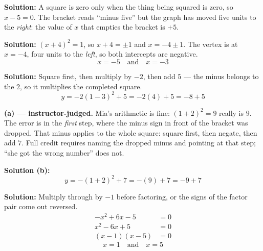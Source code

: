 \documentclass[12pt]{article}
\begin{document}




\textbf{Solution:} A square is zero only when the thing being squared is zero, so $x - 5 = 0$. The bracket reads ``minus five'' but the graph has moved five units to the \emph{right}: the value of $x$ that empties the bracket is $+5$. 


\textbf{Solution:} $(x+4)^2 = 1$, so $x + 4 = \pm 1$ and $x = -4 \pm 1$. The vertex is at $x = -4$, four units to the \emph{left}, so both intercepts are negative.
\[ \boxed{x = -5 \quad \text{and} \quad x = -3} \]


\textbf{Solution:} Square first, then multiply by $-2$, then add $5$ --- the minus belongs to the $2$, so it multiplies the completed square.
\[ y = -2(1-3)^2 + 5 = -2(4) + 5 = -8 + 5 \]


\textbf{(a) --- instructor-judged.} Mia's arithmetic is fine: $(1+2)^2 = 9$ really is $9$. The error is in the \emph{first} step, where the minus sign in front of the bracket was dropped. That minus applies to the whole square: square first, then negate, then add $7$. Full credit requires naming the dropped minus and pointing at that step; ``she got the wrong number'' does not.

\textbf{Solution (b):}
\[ y = -(1+2)^2 + 7 = -(9) + 7 = -9 + 7 \]


\textbf{Solution:} Multiply through by $-1$ before factoring, or the signs of the factor pair come out reversed.
\begin{align*}
  -x^2 + 6x - 5 &= 0 \\
  x^2 - 6x + 5 &= 0 \\
  (x-1)(x-5) &= 0
\end{align*}
\[ \boxed{x = 1 \quad \text{and} \quad x = 5} \]

\end{document}
